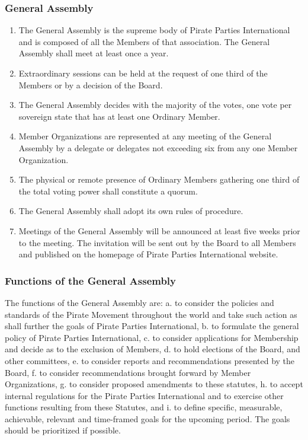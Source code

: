 \begin{frame}

\frametitle{General Assembly}
\label{generalassembly}

\begin{enumerate}
\item The General Assembly is the supreme body of Pirate Parties International and is composed of all the Members of that association. The General Assembly shall meet at least once a year.

\item Extraordinary sessions can be held at the request of one third of the Members or by a decision of the Board.

\item The General Assembly decides with the majority of the votes, one vote per sovereign state that has at least one Ordinary Member.

\item Member Organizations are represented at any meeting of the General Assembly by a delegate or delegates not exceeding six from any one Member Organization.

\item The physical or remote presence of Ordinary Members gathering one third of the total voting power shall constitute a quorum.

\item The General Assembly shall adopt its own rules of procedure.

\item Meetings of the General Assembly will be announced at least five weeks prior to the meeting. The invitation will be sent out by the Board to all Members and published on the homepage of Pirate Parties International website.

\end{enumerate}

\end{frame}

\begin{frame}

\frametitle{Functions of the General Assembly}
\label{functionsofthegeneralassembly}

The functions of the General Assembly are:
a. to consider the policies and standards of the Pirate Movement throughout the world and take such action as shall further the goals of Pirate Parties International,
b. to formulate the general policy of Pirate Parties International,
c. to consider applications for Membership and decide as to the exclusion of Members,
d. to hold elections of the Board, and other committees,
e. to consider reports and recommendations presented by the Board,
f. to consider recommendations brought forward by Member Organizations,
g. to consider proposed amendments to these statutes,
h. to accept internal regulations for the Pirate Parties International and to exercise other functions resulting from these Statutes, and
i. to define specific, measurable, achievable, relevant and time-{}framed goals for the upcoming period. The goals should be prioritized if possible.

\end{frame}

